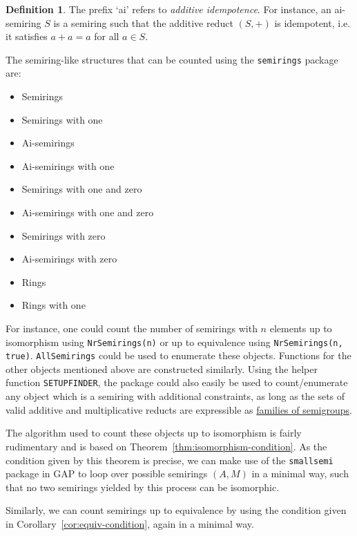 \documentclass{article}
\theoremstyle{definition}
\newtheorem{defn}{Definition}[section]
\theoremstyle{plain}
\begin{document}
\begin{defn}
    The prefix `ai' refers to \emph{additive idempotence}. For instance, an ai-semiring \(S\) is a semiring such that the additive reduct $(S, +)$ is idempotent, i.e. it satisfies \(a + a = a\) for all \(a\in S\).
\end{defn}

The semiring-like structures that can be counted using the \texttt{semirings} package are:

\begin{multicols}{2}
\begin{itemize}
    \item Semirings
    \item Semirings with one
    \item Ai-semirings
    \item Ai-semirings with one
    \item Semirings with one and zero
    \item Ai-semirings with one and zero
    \item Semirings with zero
    \item Ai-semirings with zero
    \item Rings
    \item Rings with one
\end{itemize}
\end{multicols}

For instance, one could count the number of semirings with \(n\) elements up to isomorphism using \texttt{NrSemirings(n)} or up to equivalence using \texttt{NrSemirings(n, true)}. \texttt{AllSemirings} could be used to enumerate these objects. Functions for the other objects mentioned above are constructed similarly. Using the helper function \texttt{SETUPFINDER}, the package could also easily be used to count/enumerate any object which is a semiring with additional constraints, as long as the sets of valid additive and multiplicative reducts are expressible as \href{https://gap-packages.github.io/smallsemi/doc/chap4_mj.html#X82F9C36C86006857}{families of semigroups}.

The algorithm used to count these objects up to isomorphism is fairly rudimentary and is based on Theorem~\ref{thm:isomorphism-condition}. As the condition given by this theorem is precise, we can make use of the \texttt{smallsemi} package in GAP to loop over possible semirings \((A, M)\) in a minimal way, such that no two semirings yielded by this process can be isomorphic.

Similarly, we can count semirings up to equivalence by using the condition given in Corollary~\ref{cor:equiv-condition}, again in a minimal way.
\end{document}
